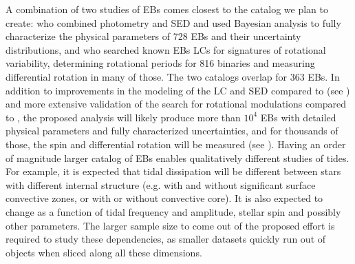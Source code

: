 A combination of two studies of \kepler{} EBs comes closest to the catalog we
plan to create: \citep{Windemuth_et_al_19} who combined photometry and SED and
used Bayesian analysis to fully characterize the physical parameters of 728 EBs
and their uncertainty distributions, and \citep{Lurie_et_al_17} who searched
known \kepler{} EBs LCs for signatures of rotational variability, determining
rotational periods for 816 binaries and measuring differential rotation in many
of those. The two catalogs overlap for 363 EBs. In addition to improvements in
the modeling of the LC and SED compared to \citep{Windemuth_et_al_19} (see
) and more extensive validation of the search
for rotational modulations compared to \citep{Lurie_et_al_17}, the proposed
analysis will likely produce more than $10^4$ EBs with detailed physical
parameters and fully characterized uncertainties, and for thousands of those,
the spin and differential rotation will be measured (see
). Having an order of magnitude larger catalog of EBs
enables qualitatively different studies of tides. For example, it is expected
that tidal dissipation will be different between stars with different internal
structure (e.g. with and without significant surface convective zones, or with
or without convective core). It is also expected to change as a function of
tidal frequency and amplitude, stellar spin and possibly other parameters. The
larger sample size to come out of the proposed effort is required to study these
dependencies, as smaller datasets quickly run out of objects when sliced along
all these dimensions.

